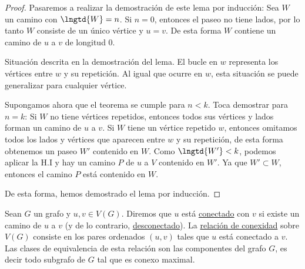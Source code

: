 \begin{proof}
    Pasaremos a realizar la demostración de este lema por inducción: Sea $W$ un camino con $\lngtd{W} = n$. Si $n = 0$, entonces el paseo no tiene lados, por lo tanto $W$ consiste de un único vértice y $u = v$. De esta forma $W$ contiene un camino de $u$ a $v$ de longitud $0$.
    
    \begin{marginfigure}
        \centering
        \caption{Situación descrita en la demostración del lema. El bucle en $w$ representa los vértices entre $w$ y su repetición. Al igual que ocurre en $w$, esta situación se puede generalizar para cualquier vértice.}
    \end{marginfigure}
    
    Supongamos ahora que el teorema se cumple para $n < k$. Toca demostrar para $n = k$: Si $W$ no tiene vértices repetidos, entonces todos sus vértices y lados forman un camino de $u$ a $v$. Si $W$ tiene un vértice repetido $w$, entonces omitamos todos los lados y vértices que aparecen entre $w$ y su repetición, de esta forma obtenemos un paseo $W'$ contenido en $W$. Como $\lngtd{W'} < k$, podemos aplicar la H.I y hay un camino $P$ de $u$ a $V$ contenido en $W'$. Ya que $W' \subset W$, entonces el camino $P$ está contenido en $W$.
    
    De esta forma, hemos demostrado el lema por inducción.
\end{proof}

\begin{defn}
    Sean $G$ un grafo y $u, v \in V(G)$. Diremos que $u$ está \ul{conectado} con $v$ si existe un camino de $u$ a $v$ (y de lo contrario, \ul{desconectado}). La \ul{relación de conexidad} sobre $V(G)$ consiste en los pares ordenados $(u,v)$ tales que $u$ está conectado a $v$. Las clases de equivalencia de esta relación son las componentes del grafo $G$, es decir todo subgrafo de $G$ tal que es conexo maximal.
\end{defn}

